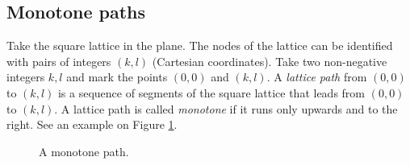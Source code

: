 \subsection{Monotone paths}
Take the square lattice in the plane.
The nodes of the lattice can be identified with pairs of integers $(k,l)$ (Cartesian coordinates).
Take two non-negative integers $k, l$ and mark the points $(0,0)$ and $(k,l)$.
A \emph{lattice path} from $(0,0)$ to $(k,l)$ is a sequence of segments of the square lattice
that leads from $(0,0)$ to $(k,l)$.
A lattice path is called \emph{monotone} if it runs only upwards and to the right.
See an example on Figure \ref{fig:MonPath}.

\begin{figure}[htb]
\begin{center}

\end{center}
\caption{A monotone path.}
\label{fig:MonPath}
\end{figure}
